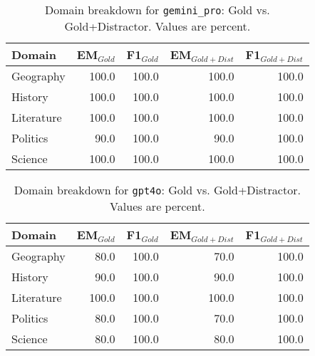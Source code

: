 \begin{table}[t]\centering
\caption{Domain breakdown for \texttt{gemini_pro}: Gold vs. Gold+Distractor. Values are percent.}
\label{tab:domain-gemini_pro}
\begin{tabular}{lrrrr}
\toprule
Domain & EM$_{Gold}$ & F1$_{Gold}$ & EM$_{Gold+Dist}$ & F1$_{Gold+Dist}$ \\
\midrule
Geography & 100.0 & 100.0 & 100.0 & 100.0 \\
History & 100.0 & 100.0 & 100.0 & 100.0 \\
Literature & 100.0 & 100.0 & 100.0 & 100.0 \\
Politics & 90.0 & 100.0 & 90.0 & 100.0 \\
Science & 100.0 & 100.0 & 100.0 & 100.0 \\
\bottomrule
\end{tabular}
\end{table}

\begin{table}[t]\centering
\caption{Domain breakdown for \texttt{gpt4o}: Gold vs. Gold+Distractor. Values are percent.}
\label{tab:domain-gpt4o}
\begin{tabular}{lrrrr}
\toprule
Domain & EM$_{Gold}$ & F1$_{Gold}$ & EM$_{Gold+Dist}$ & F1$_{Gold+Dist}$ \\
\midrule
Geography & 80.0 & 100.0 & 70.0 & 100.0 \\
History & 90.0 & 100.0 & 90.0 & 100.0 \\
Literature & 100.0 & 100.0 & 100.0 & 100.0 \\
Politics & 80.0 & 100.0 & 70.0 & 100.0 \\
Science & 80.0 & 100.0 & 80.0 & 100.0 \\
\bottomrule
\end{tabular}
\end{table}

